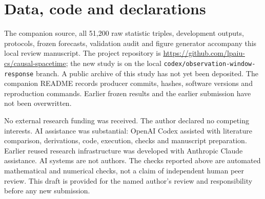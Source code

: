 \documentclass[11pt,a4paper]{article}
\begin{document}
\section*{Data, code and declarations}
The companion source, all 51,200 raw statistic triples, development outputs,
protocols, frozen forecasts, validation audit and figure generator accompany
this local review manuscript. The project repository is
\url{https://github.com/lpaiu-cs/causal-spacetime}; the new study is on the local
\texttt{codex/observation-window-response} branch. A public archive of this
study has not yet been deposited. The companion README records producer
commits, hashes, software versions and reproduction commands. Earlier frozen
results and the earlier submission have not been overwritten.

No external research funding was received. The author declared no competing
interests. AI assistance was substantial: OpenAI Codex assisted with literature
comparison, derivations, code, execution, checks and manuscript preparation.
Earlier reused research infrastructure was developed with Anthropic Claude
assistance. AI systems are not authors. The checks reported above are automated
mathematical and numerical checks, not a claim of independent human peer review.
This draft is provided for the named author's review and responsibility before
any new submission.

\appendix
\end{document}
